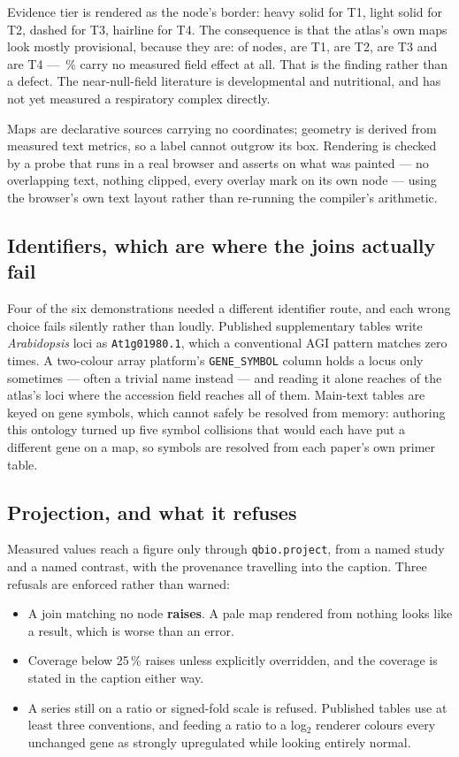 \documentclass[11pt,a4paper]{article}
\begin{document}
Evidence tier is rendered as the node's border: heavy solid for T1, light solid for T2,
dashed for T3, hairline for T4. The consequence is that the atlas's own maps look mostly
provisional, because they are: of \NNodes{} nodes, \NTierOne{} are T1, \NTierTwo{} are
T2, \NTierThree{} are T3 and \NTierFour{} are T4 --- \PctTierThreeFour\,\% carry no
measured field effect at all. That is the finding rather than a defect. The near-null-field
literature is developmental and nutritional, and has not yet measured a respiratory
complex directly.

Maps are declarative sources carrying no coordinates; geometry is derived from measured
text metrics, so a label cannot outgrow its box. Rendering is checked by a probe that
runs in a real browser and asserts on what was painted --- no overlapping text, nothing
clipped, every overlay mark on its own node --- using the browser's own text layout
rather than re-running the compiler's arithmetic.

\subsection{Identifiers, which are where the joins actually fail}

Four of the six demonstrations needed a different identifier route, and each wrong
choice fails silently rather than loudly. Published supplementary tables write
\emph{Arabidopsis} loci as \texttt{At1g01980.1}, which a conventional AGI pattern
matches zero times. A two-colour array platform's \texttt{GENE\_SYMBOL} column holds a
locus only sometimes --- often a trivial name instead --- and reading it alone reaches
\OsdEightSymbolOnly{} of the atlas's \NLoci{} loci where the accession field reaches all
of them. Main-text tables are keyed on gene symbols, which cannot safely be resolved from
memory: authoring this ontology turned up five symbol collisions that would each have put
a different gene on a map, so symbols are resolved from each paper's own primer table.

\subsection{Projection, and what it refuses}

Measured values reach a figure only through \texttt{qbio.project}, from a named study and
a named contrast, with the provenance travelling into the caption. Three refusals are
enforced rather than warned:

\begin{itemize}\itemsep2pt
\item A join matching no node \textbf{raises}. A pale map rendered from nothing looks
  like a result, which is worse than an error.
\item Coverage below 25\,\% raises unless explicitly overridden, and the coverage is
  stated in the caption either way.
\item A series still on a ratio or signed-fold scale is refused. Published tables use at
  least three conventions, and feeding a ratio to a log$_2$ renderer colours every
  unchanged gene as strongly upregulated while looking entirely normal.
\end{itemize}
\end{document}
